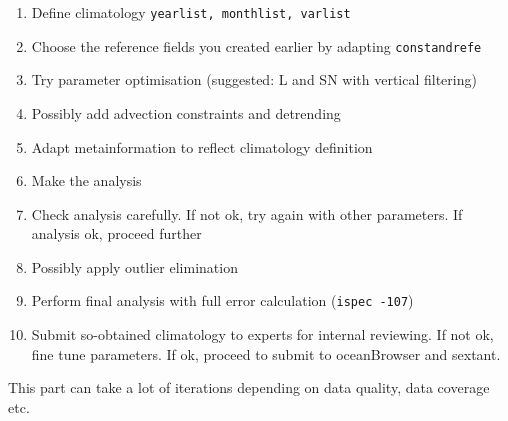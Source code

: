 \documentclass[8pt,a4paper,notitlepage]{book}
\begin{document}
\begin{enumerate}
\item Define climatology {\tt yearlist, monthlist, varlist}
\item Choose the reference fields you created earlier by adapting {\tt constandrefe}
\item Try parameter optimisation (suggested: L and SN with vertical filtering)
\item Possibly add advection constraints and detrending
\item Adapt metainformation to reflect climatology definition
\item Make the analysis
\item Check analysis carefully. If not ok, try again with other parameters. If analysis ok, proceed further
\item Possibly apply outlier elimination
\item Perform final analysis with full error calculation ({\tt ispec -107})
\item Submit so-obtained climatology to experts for internal reviewing. If not ok, fine tune parameters. If ok, proceed to submit to oceanBrowser and sextant.
\end{enumerate}


This part can take a lot of iterations depending on data quality, data coverage etc.








\end{document}
